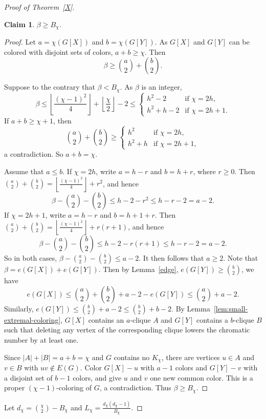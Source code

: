 \documentclass[10pt,a4paper]{amsart}
\newtheorem{claim}{Claim}[section]
\begin{document}
\begin{proof}[Proof of Theorem~\ref{X}]
\begin{claim}\label{lem:maxcut-deficiency}
 $\beta\ge B_\chi$.
\end{claim}

\begin{proof}
Let $a=\chi(G[X])$ and $b=\chi(G[Y])$. 
As $G[X]$ and $G[Y]$ can be colored with disjoint sets of colors, $a+b\ge \chi$. Then
\[
\beta\ge\binom a2+\binom b2.
\]

Suppose to the contrary that $\beta<B_\chi$. As $\beta$ is an integer,
\[
\beta\le \left\lfloor\frac{(\chi-1)^2}{4}\right\rfloor
 +\left\lfloor\frac{\chi}{2}\right\rfloor-2\le \begin{cases}
h^2-2 &\text{if }\chi=2h,\\
h^2+h-2 &\text{if }\chi=2h+1.
\end{cases}
\]
If $a+b\ge \chi+1$, then
\[
\binom a2+\binom b2\ge
\begin{cases}
h^2 &\text{if }\chi=2h,\\
h^2+h &\text{if }\chi=2h+1,
\end{cases}
\]
a contradiction. So $a+b=\chi$.

Assume that $a\le b$. 
If $\chi=2h$, write $a=h-r$ and $b=h+r$, where $r\ge0$. Then
$\binom a2+\binom b2=\left\lfloor\frac{(\chi-1)^2}{4}\right\rfloor+r^2$, 
and hence
\[
\beta-\binom a2-\binom b2
 \le h-2-r^2\le h-r-2=a-2.
\]
If $\chi=2h+1$, write $a=h-r$ and $b=h+1+r$. Then
$\binom a2+\binom b2=\left\lfloor\frac{(\chi-1)^2}{4}\right\rfloor+r(r+1)$,
and hence
\[
\beta-\binom a2-\binom b2
 \le h-2-r(r+1)\le h-r-2=a-2.
\]
So in both cases, $\beta-\binom a2-\binom b2\le a-2$.
It then follows that $a\ge2$. 
Note that $\beta=e(G[X])+e(G[Y])$. Then by Lemma~\ref{edge}, $e(G[Y])\ge \binom b2$, we have  \[
e(G[X])\le \binom a2+\binom b2+a-2-e(G[Y])\le \binom a2+a-2.
\]
Similarly, $e(G[Y])\le \binom b2+a-2\le \binom b2 +b-2$. 
By Lemma~\ref{lem:small-extremal-coloring},
$G[X]$ contains an $a$-clique $A$ and $G[Y]$ contains a $b$-clique $B$ such that deleting any vertex of the corresponding clique lowers the chromatic number  by at least one.

Since $|A|+|B|=a+b=\chi$ and $G$ contains no $K_\chi$, there are vertices $u\in A$ and $v\in B$ with
$uv\notin E(G)$. Color $G[X]-u$ with $a-1$ colors and $G[Y]-v$ with a disjoint set of $b-1$ colors,
and give $u$ and $v$ one new common color. This is a proper $(\chi-1)$-coloring of $G$, a contradiction.
Thus $\beta\ge B_\chi$. 
\end{proof}

Let $d_\chi=\binom{\chi}{2}-B_\chi$ and $L_\chi=\frac{d_\chi(d_\chi-1)}{B_\chi}$.


\end{proof}
\end{document}
